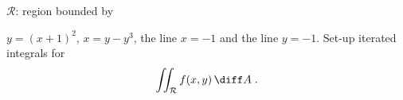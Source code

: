 \begin{frame}
\begin{example}

 $\mathcal{R}$: region bounded by

$y=(x+1)^2$, $x=y-y^3$, the line $x=-1$ and the line $y=-1$. Set-up iterated integrals for
$$\iint_{\mathcal{R}} f(x,y) \, \diff A \; .$$
\end{example}


\end{frame}